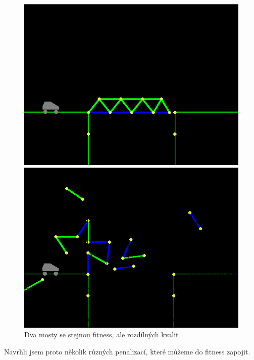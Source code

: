 \begin{figure}[ht]
    \centering
    \begin{minipage}{0.49\textwidth}
        \centering
       \includegraphics[width=\linewidth]{img/almost_good_bridge.png}
    \end{minipage}\hfill
    \begin{minipage}{0.49\textwidth}
        \centering
        \includegraphics[width=\linewidth]{img/bad_bridge.png}
    \end{minipage}
    \caption{Dva mosty se stejnou fitness, ale rozdílných kvalit}
    \label{impl-fig:6}
\end{figure}

Navrhli jsem proto několik různých penalizací, které můžeme do fitness zapojit.

